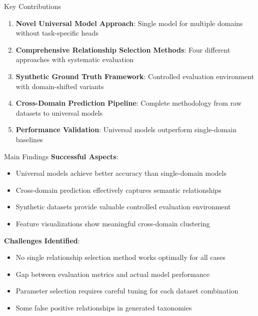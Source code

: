 \documentclass[aspectratio=169]{beamer}
\begin{document}
\begin{frame}{Key Contributions}
    \begin{enumerate}
        \item \textbf{Novel Universal Model Approach}: Single model for multiple domains without task-specific heads

        \item \textbf{Comprehensive Relationship Selection Methods}: Four different approaches with systematic evaluation

        \item \textbf{Synthetic Ground Truth Framework}: Controlled evaluation environment with domain-shifted variants

        \item \textbf{Cross-Domain Prediction Pipeline}: Complete methodology from raw datasets to universal models

        \item \textbf{Performance Validation}: Universal models outperform single-domain baselines
    \end{enumerate}
\end{frame}

\begin{frame}{Main Findings}
    \textbf{Successful Aspects}:
    \begin{itemize}
        \item Universal models achieve better accuracy than single-domain models
        \item Cross-domain prediction effectively captures semantic relationships
        \item Synthetic datasets provide valuable controlled evaluation environment
        \item Feature visualizations show meaningful cross-domain clustering
    \end{itemize}

    \vspace{1em}

    \textbf{Challenges Identified}:
    \begin{itemize}
        \item No single relationship selection method works optimally for all cases
        \item Gap between evaluation metrics and actual model performance
        \item Parameter selection requires careful tuning for each dataset combination
        \item Some false positive relationships in generated taxonomies
    \end{itemize}
\end{frame}
\end{document}

